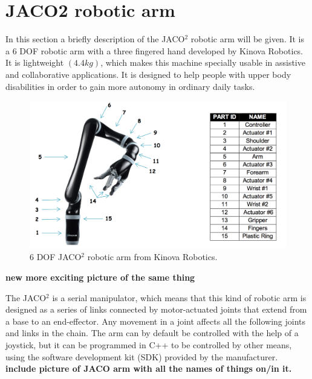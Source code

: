 \section{JACO2 robotic arm}

In this section a briefly description of the JACO$^2$ robotic arm will be given. It is a 6 DOF robotic arm  with a three fingered hand developed by Kinova Robotics. It is lightweight $\left( 4.4 kg\right)$, which makes this machine specially usable in assistive and collaborative applications. It is designed to help people with upper body disabilities in order to gain more autonomy in ordinary daily tasks.\\

\begin{figure}[H]                    
\includegraphics[width=.5\textwidth]{figures/Jaco/roboticarm}  %
\caption{6 DOF JACO$^2$ robotic arm from Kinova Robotics. \cite{kinova2017}}
\label{fig:roboticarm}  %
\end{figure}
\textbf{new more exciting picture of the same thing}

The JACO$^2$ is a serial manipulator, which means that this kind of robotic arm is designed as a series of links connected by motor-actuated joints that extend from a base to an end-effector. Any movement in a joint affects all the following joints and links in the chain. The arm can by default be controlled with the help of a joystick, but it can be programmed in C++ to be controlled by other means, using the software development kit (SDK) provided by the manufacturer.\\

\textbf{include picture of JACO arm with all the names of things on/in it.}


